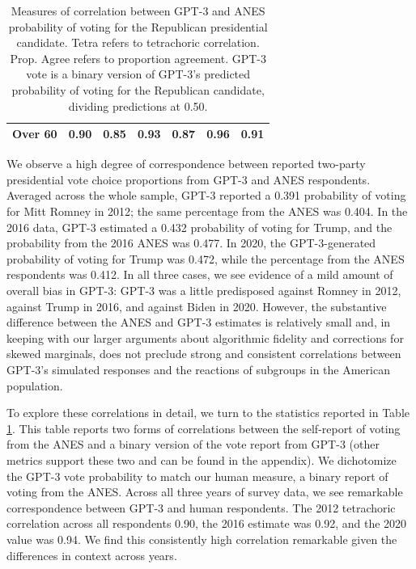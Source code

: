 \documentclass[11pt]{article}
\begin{document}
\begin{table}[t!]
\begin{tabular}{lc c c c c c}
Over 60 & 0.90 & 0.85 & 0.93 & 0.87 & 0.96 & 0.91\\
\hline
\end{tabular}
\caption{Measures of correlation between GPT-3 and ANES probability of voting for the Republican presidential candidate. Tetra refers to tetrachoric correlation. Prop. Agree refers to proportion agreement. GPT-3 vote is a binary version of GPT-3's predicted probability of voting for the Republican candidate, dividing predictions at 0.50.}
\label{tab:anescorr}
\end{table}

We observe a high degree of correspondence between reported two-party presidential vote choice proportions from GPT-3 and ANES respondents. Averaged across the whole sample, GPT-3 reported a 0.391 probability of voting for Mitt Romney in 2012; the same percentage from the ANES was 0.404. In the 2016 data, GPT-3 estimated a 0.432 probability of voting for Trump, and the probability from the 2016 ANES was 0.477. In 2020, the GPT-3-generated probability of voting for Trump was 0.472, while the percentage from the ANES respondents was 0.412. In all three cases, we see evidence of a mild amount of overall bias in GPT-3: GPT-3 was a little predisposed against Romney in 2012, against Trump in 2016, and against Biden in 2020. However, the substantive difference between the ANES and GPT-3 estimates is relatively small and, in keeping with our larger arguments about algorithmic fidelity and corrections for skewed marginals, does not preclude strong and consistent correlations between GPT-3's simulated responses and the reactions of subgroups in the American population.

To explore these correlations in detail, we turn to the statistics reported in Table \ref{tab:anescorr}. This table reports two forms of correlations between the self-report of voting from the ANES and a binary version of the vote report from GPT-3 (other metrics support these two and can be found in the appendix). We dichotomize the GPT-3 vote probability to match our human measure, a binary report of voting from the ANES. Across all three years of survey data, we see remarkable correspondence between GPT-3 and human respondents. The 2012 tetrachoric correlation across all respondents 0.90, the 2016 estimate was 0.92, and the 2020 value was 0.94. We find this consistently high correlation remarkable given the differences in context across years.
\end{document}
